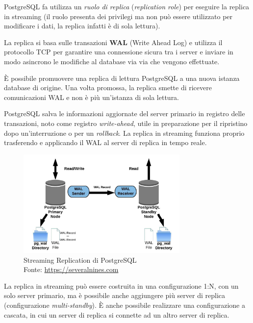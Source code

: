PostgreSQL fa utilizza un \textit{ruolo di replica} (\textit{replication role}) per eseguire la replica in streaming (il ruolo presenta dei privilegi ma non può essere utilizzato per modificare i dati, la replica infatti è di sola lettura).

La replica si basa sulle transazioni \textbf{WAL} (Write Ahead Log) e utilizza il protocollo TCP per garantire una connessione sicura tra i server e inviare in modo asincrono le modifiche al database via via che vengono effettuate.

È possibile promuovere una replica di lettura PostgreSQL a una nuova istanza database di origine. Una volta promossa, la replica smette di ricevere comunicazioni WAL e non è più un'istanza di sola lettura.

PostgreSQL salva le informazioni aggiornate del server primario in registro delle transazioni, noto come registro \textit{write-ahead}, utile in preparazione per il ripristino dopo un'interruzione o per un \textit{rollback}. La replica in streaming funziona proprio trasferendo e applicando il WAL al server di replica in tempo reale.

\begin{figure}[H]
\centering
\captionsetup{justification=centering}
\includegraphics[width=0.75\textwidth,height=\textheight,keepaspectratio]{img/streaming_replication.jpg}
\caption{Streaming Replication di PostgreSQL\\Fonte: \url{https://severalnines.com}}
\label{fig:streaming-replication}
\end{figure}

La replica in streaming può essere costruita in una configurazione 1:N, con un solo server primario, ma è possibile anche aggiungere più server di replica (configurazione \textit{multi-standby}). È anche possibile realizzare una configurazione a cascata, in cui un server di replica si connette ad un altro server di replica.

